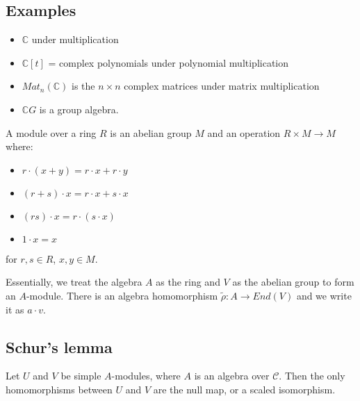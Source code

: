 \documentclass[]{report}
\theoremstyle{definition}
\numberwithin{theorem}{section}
\numberwithin{equation}{section}
\begin{document}
\subsection{Examples}
\begin{itemize}
	\item $\mathbb{C}$ under multiplication
	\item $\mathbb{C}[t]$ = complex polynomials under polynomial multiplication
	\item $Mat_n(\mathbb{C})$ is the $n \times n$ complex matrices under matrix multiplication
	\item $\mathbb{C} G$ is a group algebra.
\end{itemize}

A module over a ring $R$ is an abelian group $M$ and an operation $R \times M \rightarrow M$ where:
\begin{itemize}
	\item $r \cdot (x + y) = r \cdot x + r \cdot y$
	\item $(r + s) \cdot x = r \cdot x + s \cdot x$
	\item $(rs )\cdot x = r \cdot (s \cdot x)$
	\item $1 \cdot x = x$
\end{itemize}
for $r, s \in R$, $x, y \in M$.

Essentially, we treat the algebra $A$ as the ring and $V$ as the abelian group to form an $A$-module. There is an algebra homomorphism $\tilde{\rho}: A \rightarrow End(V)$ and we write it as $a \cdot v$. 

\subsection{Schur's lemma}
Let $U$ and $V$ be simple $A$-modules, where $A$ is an algebra over $\mathcal{C}$. Then the only homomorphisms between $U$ and $V$ are the null map, or a scaled isomorphism.
\end{document}
